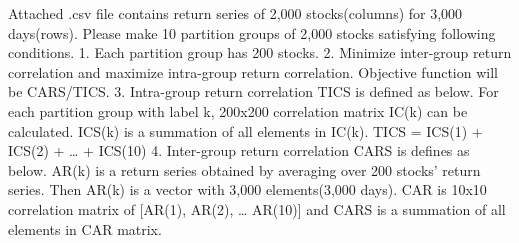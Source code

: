 \documentclass[11pt]{article}
\begin{document}
    Attached .csv file contains return series of 2,000 stocks(columns) for
3,000 days(rows). Please make 10 partition groups of 2,000 stocks
satisfying following conditions. 1. Each partition group has 200 stocks.
2. Minimize inter-group return correlation and maximize intra-group
return correlation. Objective function will be CARS/TICS. 3. Intra-group
return correlation TICS is defined as below. For each partition group
with label k, 200x200 correlation matrix IC(k) can be calculated. ICS(k)
is a summation of all elements in IC(k). TICS = ICS(1) + ICS(2) +
\ldots{} + ICS(10) 4. Inter-group return correlation CARS is defines as
below. AR(k) is a return series obtained by averaging over 200 stocks'
return series. Then AR(k) is a vector with 3,000 elements(3,000 days).
CAR is 10x10 correlation matrix of {[}AR(1), AR(2), \ldots{} AR(10){]}
and CARS is a summation of all elements in CAR matrix.
\end{document}
